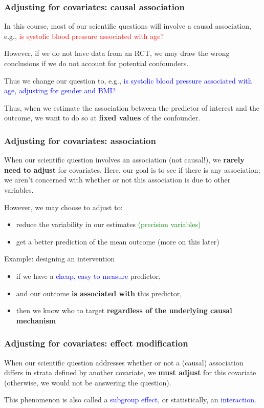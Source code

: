 \documentclass[12pt, 
hyperref={colorlinks=true, linkcolor=blue, urlcolor=cyan}]{beamer}
\begin{document}
\begin{frame}
\frametitle{Adjusting for covariates: causal association}

In this course, most of our scientific questions will involve a causal association, e.g., \textcolor{red}{is systolic blood pressure associated with age?}

However, if we do not have data from an RCT, we may draw the wrong conclusions if we do not account for potential confounders. 

Thus we change our question to, e.g., \textcolor{blue}{is systolic blood pressure associated with age, adjusting for gender and BMI?}

Thus, when we estimate the association between the predictor of interest and the outcome, we want to do so at \textbf{fixed values} of the confounder.
\end{frame}

\begin{frame}
\frametitle{Adjusting for covariates: association}
When our scientific question involves an association (not causal!), we \textbf{rarely need to adjust} for covariates. Here, our goal is to see if there is any association; we aren't concerned with whether or not this association is due to other variables. 

However, we may choose to adjust to: \vspace{-0.3cm}
\begin{itemize}
\item reduce the variability in our estimates \textcolor{green}{(precision variables)}
\item get a better prediction of the mean outcome (more on this later)
\end{itemize}

Example: designing an intervention \vspace{-0.3cm}
\begin{itemize}
\item if we have a \textcolor{blue}{cheap, easy to measure} predictor, 
\item and our outcome \textbf{is associated with} this predictor,
\item then we know who to target \textbf{regardless of the underlying causal mechanism}
\end{itemize}
\end{frame}

\begin{frame}
\frametitle{Adjusting for covariates: effect modification}

When our scientific question addresses whether or not a (causal) association differs in strata defined by another covariate, we \textbf{must adjust} for this covariate (otherwise, we would not be answering the question).

This phenomenon is also called a \textcolor{blue}{subgroup effect}, or statistically, an \textcolor{blue}{interaction}.

\end{frame}
\end{document}
